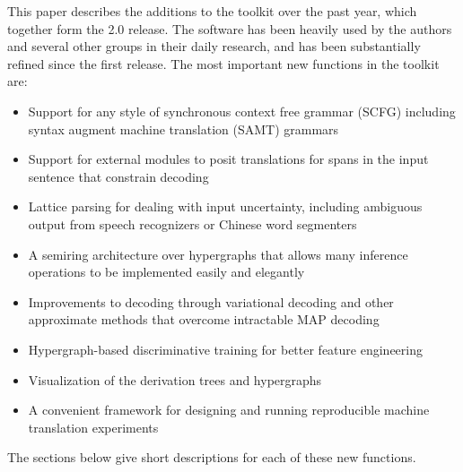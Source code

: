 \documentclass[11pt]{article}
\begin{document}
This paper describes the additions to the toolkit over the past year, which together form the 2.0 release. The software has been heavily used by the authors and several other groups in their daily research, and has been substantially refined since the first release.  The most important new functions in the toolkit are: 
\begin{itemize}
\item
Support for any style of synchronous context free grammar (SCFG)
including syntax augment machine translation (SAMT) grammars \cite{samt2006}
\item
Support for external modules to posit translations for spans in the input sentence that constrain decoding   \cite{PBML-2010-Joshua-modules}
\item
Lattice parsing for dealing with input uncertainty, including ambiguous output from speech recognizers or Chinese word segmenters  \cite{dyer-muresan-resnik:2008:ACLMain}
\item
A semiring architecture over hypergraphs that allows many inference operations to be implemented easily and elegantly \cite{li-eisner:2009:EMNLP}
\item
Improvements to decoding through variational decoding and other approximate methods that overcome intractable MAP decoding \cite{variational-decoding-acl09}
\item
Hypergraph-based discriminative training for better feature engineering \cite{zhifei-forest-reranking-galebook}
\item
Visualization of the derivation trees and hypergraphs \cite{PBML-2010-Joshua-visualization}
\item
A convenient framework for designing and running reproducible machine translation experiments \cite{Schwartz-wmt10-pipline}
\end{itemize}
The sections below give short descriptions for each of these new functions.
\end{document}

